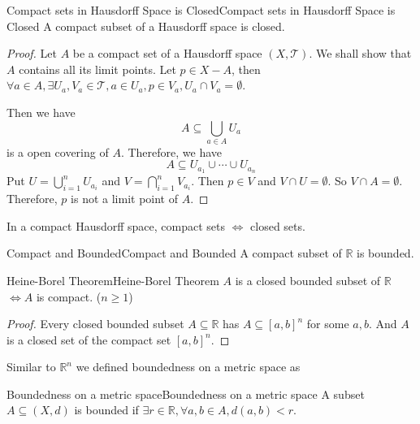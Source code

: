 \documentclass[../main.tex]{subfiles}
\begin{document}
\begin{theorem}{Compact sets in Hausdorff Space is Closed}{Compact sets in Hausdorff Space is Closed}
A compact subset of a Hausdorff space is closed.
\end{theorem}
\begin{proof}
Let $A$ be a compact set of a Hausdorff space $(X,\mathcal{T})$. We shall show that $A$ contains all its limit points. Let $p\in X-A$, then $\forall a\in A, \exists U_a,V_a\in \mathcal{T},a\in U_a,p\in V_a,U_a\cap V_a = \emptyset $.

Then we have
\begin{equation*}
A \subseteq \bigcup_{a\in A} U_a
\end{equation*}
is a open covering of $A$. Therefore, we have
\begin{equation*}
A \subseteq U_{a_1}\cup \cdots \cup U_{a_n}
\end{equation*}
Put $U = \bigcup_{i=1}^{n} U_{a_i}$ and $V = \bigcap_{i=1}^{n} V_{a_i}$. Then $p\in V$ and $V\cap U=\emptyset $. So $V \cap A=\emptyset $. Therefore, $p$ is not a limit point of $A$.
\end{proof}

\begin{remark}
In a compact Hausdorff space, compact sets $\Leftrightarrow $ closed sets.
\end{remark}

\begin{proposition}{Compact and Bounded}{Compact and Bounded}
A compact subset of $\mathbb{R}$ is bounded.
\end{proposition}

\begin{theorem}{Heine-Borel Theorem}{Heine-Borel Theorem}
$A$ is a closed bounded subset of $\mathbb{R}$ $\Leftrightarrow A$ is compact. ($n \geq 1$)
\end{theorem}
\begin{proof}
	Every closed bounded subset $A \subseteq \mathbb{R}$ has $A \subseteq [a,b]^n$ for some $a,b$. And $A$ is a closed set of the compact set $[a,b]^n$.
\end{proof}

Similar to $\mathbb{R}^n$ we defined boundedness on a metric space as
\begin{definition}{Boundedness on a metric space}{Boundedness on a metric space}
A subset $A \subseteq (X,d)$ is bounded if $\exists r\in \mathbb{R}, \forall a,b\in A,d(a,b)<r$.
\end{definition}
\end{document}

